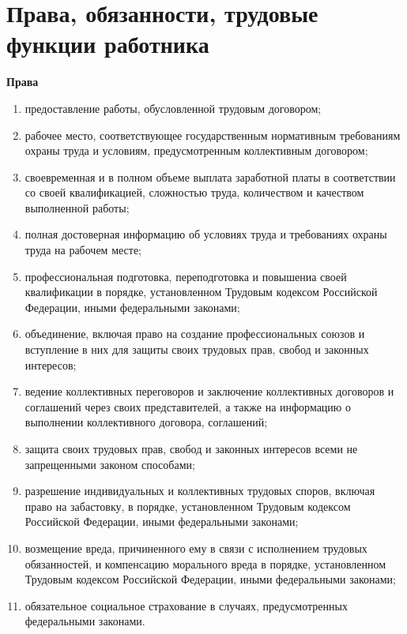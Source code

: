 \documentclass[a4paper]{article}
\begin{document}
	\section{Права, обязанности, трудовые функции работника}
		\textbf{Права}
		\begin{enumerate}
			\item предоставление работы, обусловленной трудовым договором;
			
			\item рабочее место, соответствующее государственным нормативным требованиям охраны труда и условиям, предусмотренным коллективным договором;
			
			\item своевременная и в полном объеме выплата заработной платы в соответствии со своей квалификацией, сложностью труда, количеством и качеством выполненной работы;
			
			\item  полная достоверная информацию об условиях труда и требованиях охраны труда на рабочем месте;
			
			\item профессиональная подготовка, переподготовка и повышениа своей квалификации в порядке, установленном Трудовым кодексом Российской Федерации, иными федеральными законами;
			
			\item объединение, включая право на создание профессиональных союзов и вступление в них для защиты своих трудовых прав, свобод и законных интересов;
			
			\item ведение коллективных переговоров и заключение коллективных договоров и соглашений через своих представителей, а также на информацию о выполнении коллективного договора, соглашений;
			
			\item защита своих трудовых прав, свобод и законных интересов всеми не запрещенными законом способами;
			
			\item разрешение индивидуальных и коллективных трудовых споров, включая право на забастовку, в порядке, установленном Трудовым кодексом Российской Федерации, иными федеральными законами;
			
			\item возмещение вреда, причиненного ему в связи с исполнением трудовых обязанностей, и компенсацию морального вреда в порядке, установленном Трудовым кодексом Российской Федерации, иными федеральными законами;
			
			\item обязательное социальное страхование в случаях, предусмотренных федеральными законами.
		\end{enumerate}
	
\end{document}

